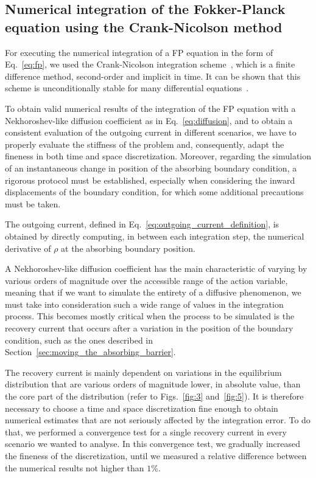 \begin{chapterappendices}
\subsection{Numerical integration of the Fokker-Planck equation using the Crank-Nicolson method} \label{app_sec:numerical_integration_with_crank_nicolson}


For executing the numerical integration of a FP equation in the form of Eq.~\eqref{eq:fp}, we used the Crank-Nicolson integration scheme~\cite{crank1947practical}, which is a finite difference method, second-order and implicit in time. It can be shown that this scheme is unconditionally stable for many differential equations~\cite{thomas2013numerical}.

To obtain valid numerical results of the integration of the FP equation with a Nekhoroshev-like diffusion coefficient as in Eq.~\eqref{eq:diffusion}, and to obtain a consistent evaluation of the outgoing current in different scenarios, we have to properly evaluate the stiffness of the problem and, consequently, adapt the fineness in both time and space discretization. Moreover, regarding the simulation of an instantaneous change in position of the absorbing boundary condition, a rigorous protocol must be established, especially when considering the inward displacements of the boundary condition, for which some additional precautions must be taken.

The outgoing current, defined in Eq.~\eqref{eq:outgoing_current_definition}, is obtained by directly computing, in between each integration step, the numerical derivative of $\rho$ at the absorbing boundary position. 

A Nekhoroshev-like diffusion coefficient has the main characteristic of varying by various orders of magnitude over the accessible range of the action variable, meaning that if we want to simulate the entirety of a diffusive phenomenon, we must take into consideration such a wide range of values in the integration process. This becomes mostly critical when the process to be simulated is the recovery current that occurs after a variation in the position of the boundary condition, such as the ones described in Section~\ref{sec:moving_the_absorbing_barrier}.

The recovery current is mainly dependent on variations in the equilibrium distribution that are various orders of magnitude lower, in absolute value, than the core part of the distribution (refer to Figs.~\ref{fig:3} and~\ref{fig:5}). It is therefore necessary to choose a time and space discretization fine enough to obtain numerical estimates that are not seriously affected by the integration error. To do that, we performed a convergence test for a single recovery current in every scenario we wanted to analyse. In this convergence test, we gradually increased the fineness of the discretization, until we measured a relative difference between the numerical results not higher than $1\%$.


\end{chapterappendices}
